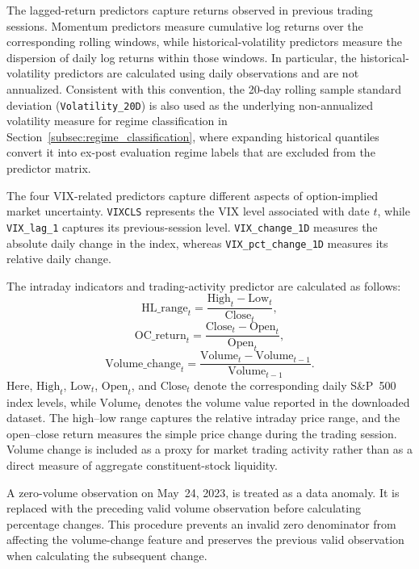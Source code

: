 \documentclass[12pt,twoside]{ord}
\begin{document}
The lagged-return predictors capture returns observed in previous trading sessions. Momentum predictors measure cumulative log returns over the corresponding rolling windows, while historical-volatility predictors measure the dispersion of daily log returns within those windows. In particular, the historical-volatility predictors are calculated using daily observations and are not annualized. Consistent with this convention, the 20-day rolling sample standard deviation (\texttt{Volatility\_20D}) is also used as the underlying non-annualized volatility measure for regime classification in Section~\ref{subsec:regime_classification}, where expanding historical quantiles convert it into ex-post evaluation regime labels that are excluded from the predictor matrix.

The four VIX-related predictors capture different aspects of option-implied market uncertainty. \texttt{VIXCLS} represents the VIX level associated with date $t$, while \texttt{VIX\_lag\_1} captures its previous-session level. \texttt{VIX\_change\_1D} measures the absolute daily change in the index, whereas \texttt{VIX\_pct\_change\_1D} measures its relative daily change.

The intraday indicators and trading-activity predictor are calculated as follows:
\begin{equation}\label{eq:hl_range}
\text{HL\_range}_t = \frac{\text{High}_t - \text{Low}_t}{\text{Close}_t},
\end{equation}
\begin{equation}\label{eq:oc_return}
\text{OC\_return}_t = \frac{\text{Close}_t - \text{Open}_t}{\text{Open}_t},
\end{equation}
\begin{equation}\label{eq:volume_change}
\text{Volume\_change}_t = \frac{\text{Volume}_t - \text{Volume}_{t-1}}{\text{Volume}_{t-1}}.
\end{equation}
Here, $\text{High}_t$, $\text{Low}_t$, $\text{Open}_t$, and $\text{Close}_t$ denote the corresponding daily S\&P~500 index levels, while $\text{Volume}_t$ denotes the volume value reported in the downloaded dataset. The high--low range captures the relative intraday price range, and the open--close return measures the simple price change during the trading session. Volume change is included as a proxy for market trading activity rather than as a direct measure of aggregate constituent-stock liquidity.

A zero-volume observation on May~24, 2023, is treated as a data anomaly. It is replaced with the preceding valid volume observation before calculating percentage changes. This procedure prevents an invalid zero denominator from affecting the volume-change feature and preserves the previous valid observation when calculating the subsequent change.
\end{document}
